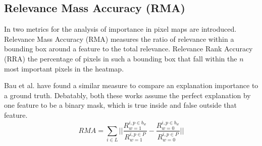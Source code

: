 \subsection{Relevance Mass Accuracy (RMA) }
In \cite{Arras2022} two metrics for the analysis of importance in pixel maps are introduced. Relevance Mass Accuracy (RMA) measures the ratio of relevance within a bounding box around a feature to the total relevance. Relevance Rank Accuracy (RRA) the percentage of pixels in such a bounding box that fall within the $n$ most important pixels in the heatmap.

Bau et al. \cite{Bau2017, Bau2020} have found a similar measure to compare an explanation importance to a ground truth. Debatably, both these works assume the perfect explanation by one feature to be a binary mask, which is true inside and false outside that feature. 
\begin{equation}
\displaystyle
    RMA =
    \sum_{i \in L} || \frac{R_{w=1}^{i,p \in b_w}}{R_{w=1}^{i,p \in P}} - \frac{R_{w=0}^{i,p \in b_w}}{R_{w=0}^{i,p \in P}}  ||
\end{equation}

